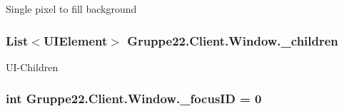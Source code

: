 Single pixel to fill background 

\hypertarget{class_gruppe22_1_1_client_1_1_window_a3183f9f2663e2973529ddd494cbb847a}{
\subsubsection[{\-\_\-children}]{\setlength{\rightskip}{0pt plus 5cm}List$<${\bf U\-I\-Element}$>$ Gruppe22.\-Client.\-Window.\-\_\-children\hspace{0.3cm}{\ttfamily [protected]}}}\label{class_gruppe22_1_1_client_1_1_window_a3183f9f2663e2973529ddd494cbb847a}


U\-I-\/\-Children 

\hypertarget{class_gruppe22_1_1_client_1_1_window_a2c5c9a090aecb62bb99a4a6c0e8c7e4c}{
\subsubsection[{\-\_\-focus\-I\-D}]{\setlength{\rightskip}{0pt plus 5cm}int Gruppe22.\-Client.\-Window.\-\_\-focus\-I\-D = 0\hspace{0.3cm}{\ttfamily [protected]}}}\label{class_gruppe22_1_1_client_1_1_window_a2c5c9a090aecb62bb99a4a6c0e8c7e4c}


